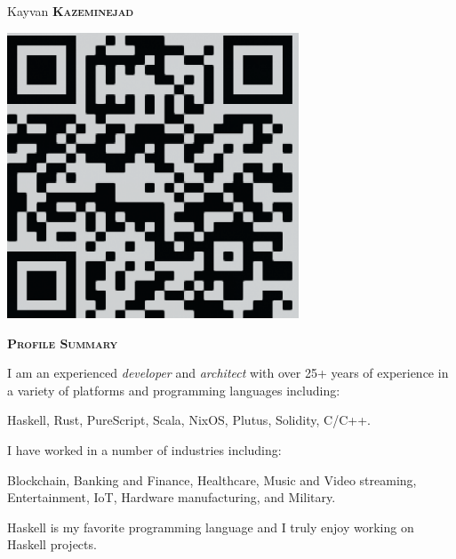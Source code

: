 \documentclass[11pt, a4paper]{article}
\newcommand{\headleft}[1]{\vspace*{3ex}\textsc{\textbf{#1}}\par%
    \vspace*{-1.5ex}\hrulefill\par\vspace*{0.7ex}}
\begin{document}
\setlength{\topskip}{0pt}
\setlength{\parindent}{0pt}
\setlength{\parskip}{0pt}
\setlength{\fboxsep}{0pt}
\pagestyle{empty}
\raggedbottom

\begin{minipage}[t]{0.33\textwidth} %
\colorbox{cvblue}{\begin{minipage}[t][5mm][t]{\textwidth}\null\hfill\null\end{minipage}}

\vspace{-.2ex} %
\colorbox{cvblue!90}{\color{white}  %
\textwidth\relax%
\begin{minipage}[t][293mm][t]{0.82\textwidth}
\raggedright
\vspace*{2.5ex}

\Large Kayvan \textbf{\textsc{Kazeminejad}} \normalsize

\null\hfill\includegraphics[width=0.65\textwidth]{qr-code.eps}\hfill\null

\vspace*{0.5ex} %

\headleft{Profile Summary}
I am an experienced \textit{developer} and \textit{architect} with over 25+ years of experience in a variety of platforms and programming languages including:\par
Haskell, Rust, PureScript, Scala, NixOS, Plutus, Solidity, C/C++.\par
I have worked in a number of industries including: \par
Blockchain, Banking and Finance, Healthcare, Music and Video streaming, Entertainment, IoT, Hardware manufacturing, and Military.\par
Haskell is my favorite programming language and I truly enjoy working on Haskell projects.


\end{minipage}}
\end{minipage}
\end{document}
